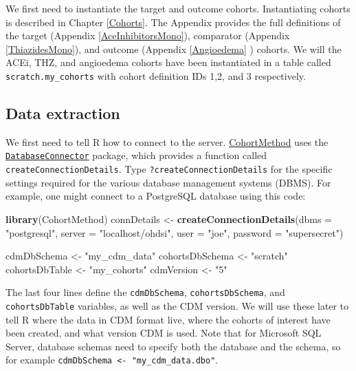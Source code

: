 \documentclass[11pt]{book}
\newenvironment{Shaded}{\begin{snugshade}}{\end{snugshade}}
\newcommand{\KeywordTok}[1]{\textcolor[rgb]{0.13,0.29,0.53}{\textbf{#1}}}
\newcommand{\DataTypeTok}[1]{\textcolor[rgb]{0.13,0.29,0.53}{#1}}
\newcommand{\StringTok}[1]{\textcolor[rgb]{0.31,0.60,0.02}{#1}}
\newcommand{\NormalTok}[1]{#1}
\begin{document}
We first need to instantiate the target and outcome cohorts.
Instantiating cohorts is described in Chapter \ref{Cohorts}. The
Appendix provides the full definitions of the target (Appendix
\ref{AceInhibitorsMono}), comparator (Appendix \ref{ThiazidesMono}), and
outcome (Appendix \ref{Angioedema} ) cohorts. We will the ACEi, THZ, and
angioedema cohorts have been instantiated in a table called
\texttt{scratch.my\_cohorts} with cohort definition IDs 1,2, and 3
respectively.

\subsection{Data extraction}\label{data-extraction}

We first need to tell R how to connect to the server.
\href{https://ohdsi.github.io/CohortMethod/}{CohortMethod} uses the
\href{https://ohdsi.github.io/DatabaseConnector/}{\texttt{DatabaseConnector}}
package, which provides a function called
\texttt{createConnectionDetails}. Type \texttt{?createConnectionDetails}
for the specific settings required for the various database management
systems (DBMS). For example, one might connect to a PostgreSQL database
using this code:

\begin{Shaded}
\begin{Highlighting}[]
\KeywordTok{library}\NormalTok{(CohortMethod)}
\NormalTok{connDetails <-}\StringTok{ }\KeywordTok{createConnectionDetails}\NormalTok{(}\DataTypeTok{dbms =} \StringTok{"postgresql"}\NormalTok{,}
                                       \DataTypeTok{server =} \StringTok{"localhost/ohdsi"}\NormalTok{,}
                                       \DataTypeTok{user =} \StringTok{"joe"}\NormalTok{,}
                                       \DataTypeTok{password =} \StringTok{"supersecret"}\NormalTok{)}

\NormalTok{cdmDbSchema <-}\StringTok{ "my_cdm_data"}
\NormalTok{cohortsDbSchema <-}\StringTok{ "scratch"}
\NormalTok{cohortsDbTable <-}\StringTok{ "my_cohorts"}
\NormalTok{cdmVersion <-}\StringTok{ "5"}
\end{Highlighting}
\end{Shaded}

The last four lines define the \texttt{cdmDbSchema},
\texttt{cohortsDbSchema}, and \texttt{cohortsDbTable} variables, as well
as the CDM version. We will use these later to tell R where the data in
CDM format live, where the cohorts of interest have been created, and
what version CDM is used. Note that for Microsoft SQL Server, database
schemas need to specify both the database and the schema, so for example
\texttt{cdmDbSchema\ \textless{}-\ "my\_cdm\_data.dbo"}.
\end{document}
